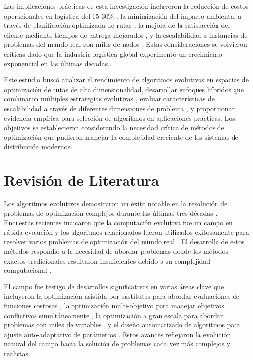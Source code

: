 \documentclass[12pt,a4paper]{article}
\begin{document}
Las implicaciones prácticas de esta investigación incluyeron la reducción de costos operacionales en logística del 15-30\% \cite{dantzig1959truck}, la minimización del impacto ambiental a través de planificación optimizada de rutas \cite{bektas2014green}, la mejora de la satisfacción del cliente mediante tiempos de entrega mejorados \cite{golden2008vehicle}, y la escalabilidad a instancias de problemas del mundo real con miles de nodos \cite{vidal2013hybrid}. Estas consideraciones se volvieron críticas dado que la industria logística global experimentó un crecimiento exponencial en las últimas décadas \cite{mckinnon2015sustainability}.

Este estudio buscó analizar el rendimiento de algoritmos evolutivos en espacios de optimización de rutas de alta dimensionalidad, desarrollar enfoques híbridos que combinaron múltiples estrategias evolutivas \cite{gendreau2010metaheuristics}, evaluar características de escalabilidad a través de diferentes dimensiones de problema \cite{eiben2015introduction}, y proporcionar evidencia empírica para selección de algoritmos en aplicaciones prácticas. Los objetivos se establecieron considerando la necesidad crítica de métodos de optimización que pudieron manejar la complejidad creciente de los sistemas de distribución modernos.

\section{Revisión de Literatura}

Los algoritmos evolutivos demostraron un éxito notable en la resolución de problemas de optimización complejos durante las últimas tres décadas \cite{eiben2015introduction}. Encuestas recientes indicaron que la computación evolutiva fue un campo en rápida evolución y los algoritmos relacionados fueron utilizados exitosamente para resolver varios problemas de optimización del mundo real \cite{yang2020metaheuristics}. El desarrollo de estos métodos respondió a la necesidad de abordar problemas donde los métodos exactos tradicionales resultaron insuficientes debido a su complejidad computacional \cite{gendreau2010metaheuristics}.

El campo fue testigo de desarrollos significativos en varias áreas clave que incluyeron la optimización asistida por sustitutos para abordar evaluaciones de funciones costosas \cite{jin2011surrogate}, la optimización multi-objetivo para manejar objetivos conflictivos simultáneamente \cite{alba2013parallel}, la optimización a gran escala para abordar problemas con miles de variables \cite{mahdavi2007large}, y el diseño automatizado de algoritmos para ajuste auto-adaptativo de parámetros \cite{hutter2011automated}. Estos avances reflejaron la evolución natural del campo hacia la solución de problemas cada vez más complejos y realistas.
\end{document}

